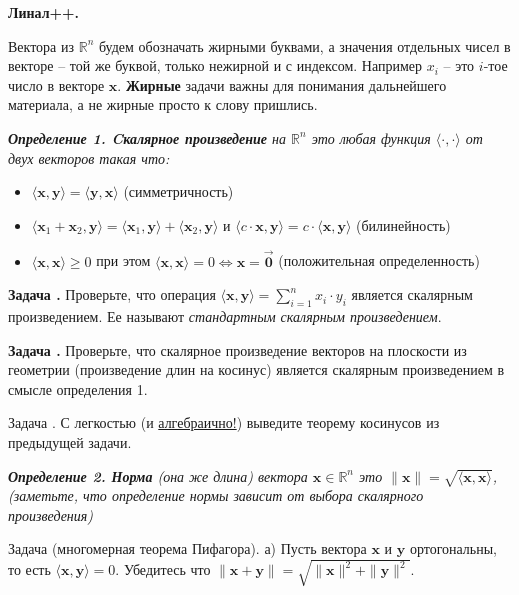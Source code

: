 \documentclass[12pt,a4paper]{article}
\def\R{\mathbb{R}}
\newcounter{znum}
\newcommand{\zz}[1]{\addtocounter{znum}{1} \textbf{Задача \arabic{znum}#1. }}
\newcommand{\z}[1]{\addtocounter{znum}{1} Задача \arabic{znum}#1. }
\begin{document}
\pagestyle{empty}

\begin{center} \Large \textbf{Линал++.}
\end{center}

Вектора из $\R^n$ будем обозначать жирными буквами, а значения отдельных чисел в векторе -- той же буквой, только нежирной и с индексом. Например $x_i$ -- это $i$-тое число в векторе $\mathbf{x}$. \textbf{Жирные} задачи важны для понимания дальнейшего материала, а не жирные просто к слову пришлись.

{\it \textbf{Определение 1. Cкалярное произведение} на $\R^n$ это любая функция $\langle \cdot , \cdot \rangle$ от двух векторов такая что:\par
\begin{itemize}
	\item $\langle \mathbf{x}, \mathbf{y} \rangle = \langle \mathbf{y}, \mathbf{x} \rangle$ (симметричность)
	\item $\langle \mathbf{x}_1 + \mathbf{x}_2, \mathbf{y} \rangle = \langle \mathbf{x}_1, \mathbf{y} \rangle + \langle \mathbf{x}_2, \mathbf{y} \rangle$  и $\langle c \cdot \mathbf{x}, \mathbf{y} \rangle = c \cdot \langle \mathbf{x}, \mathbf{y} \rangle$ (билинейность)
	\item $\langle \mathbf{x}, \mathbf{x} \rangle \geqslant 0$ при этом  $\langle \mathbf{x}, \mathbf{x} \rangle = 0 \Leftrightarrow \mathbf{x} = \overrightarrow{\mathbf{0}}$ (положительная определенность)
\end{itemize}
}

\zz{} Проверьте, что операция $ \langle \mathbf{x}, \mathbf{y} \rangle = \sum_{i = 1}^n x_i \cdot y_i$ является скалярным произведением. Ее называют {\it стандартным скалярным произведением}.

\zz{} Проверьте, что скалярное произведение векторов на плоскости из геометрии (произведение длин на косинус) является скалярным произведением в смысле определения 1.

\z{} С легкостью (и \href{https://www.youtube.com/watch?v=NpYzlF1c\_1I}{алгебраично!}) выведите теорему косинусов из предыдущей задачи.

{\it \textbf{Определение 2. Норма} (она же длина) вектора $\mathbf{x} \in \R^n$ это $ \|\mathbf{x}\| = \sqrt{\langle \mathbf{x}, \mathbf{x} \rangle}$, (заметьте, что определение нормы зависит от выбора скалярного произведения)}

\z{ (многомерная теорема Пифагора)} а) Пусть вектора $\mathbf{x}$ и $\mathbf{y}$ ортогональны, то есть $\langle \mathbf{x}, \mathbf{y} \rangle = 0$. Убедитесь что $\|\mathbf{x} + \mathbf{y}\| = \sqrt{\|\mathbf{x}\|^2 + \|\mathbf{y}\|^2}$.
\end{document}
